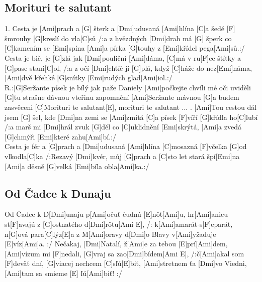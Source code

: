 \documentclass[10pt]{article}
\begin{document}
\begin{Large}
\begin{minipage}{\textwidth}
\subsection{Morituri te salutant}
\begin{multicols}{2}
\begin{guitar}
	1.
	Cesta je [Ami]prach a [G] šterk a [Dmi]udusaná [Ami]hlína 
	[C]a šedé [F] šmrouhy [G]kreslí do vla[C]sů
	/:a z hvězdných [Dmi]drah má [G] šperk 
	co [C]kamením se [Emi]spína 
	[Ami]a pírka [G]touhy z [Emi]křídel pega[Ami]sů.:/	
	\\
	Cesta je bič, je [G]zlá jak [Dmi]pouliční [Ami]dáma, 
	[C]má v ru[F]ce štítky a [G]pase stani[C]ol, 
	/:a z očí [Dmi]chtíč jí [G]plá, když [C]háže do nez[Emi]náma, 
	[Ami]dvě křehké [G]snítky [Emi]rudých glad[Ami]iol.:/
	\\
	R.:[G]Seržante písek je bílý jak paže Daniely
	[Ami]počkejte chvíli mé oči uviděli
	[G]tu strašne dávnou vteřinu zapomnění	
	[Ami]Seržante mávnou [G]a budem zasvěceni	
	[C]Morituri te salutant[E], morituri te salutant ...
	.
	[Ami]Tou cestou dál jsem [G] šel, 
	kde [Dmi]na zemi se [Ami]zmítá	
	[C]a písek [F]víří [G]křídla ho[C]lubí 
	/:a marš mi [Dmi]hrál	zvuk [G]děl 
	co [C]uklidnění [Emi]skrýtá,	
	[Ami]a zvedá [G]chmýři [Emi]které zahu[Ami]bí.:/	
	\\	
	[Ami]Cesta je fér a [G]prach a [Dmi]udusaná [Ami]hlína	
	[C]mosazná [F]včelka [G]od vlkodla[C]ka	
	/:Rezavý [Dmi]kvér, můj [G]prach a [C]sto let stará špí[Emi]na	
	[Ami]a děsně [G]velká [Emi]bíla obla[Ami]ka.:/
\end{guitar}
\end{multicols}
\end{minipage}

\begin{minipage}{\textwidth}
\subsection{Od Čadce k Dunaju}
\begin{multicols}{2}
\begin{guitar}
	[Ami]Od Čadce k D[Dmi]unaju p[Ami]očuť čudnú [E]nôt[Ami]u,
	hr[Ami]anicu st[F]avajú z [G]ostnatého d[Dmi]rôtu[Ami E],
	/: k[Ami]amarát-s[F]eparát, n[G]ová para[C]lýz[E]a
	z M[Ami]oravy d[Dmi]o Blavy v[Ami]yžaduje [E]víz[Ami]a. :/
	\columnbreak
	[Ami]Nečakaj, [Dmi]Natalí, ž[Ami]e za tebou [E]prí[Ami]dem,
	[Ami]vízum mi [F]nedali, [G]vraj sa zao[Dmi]bídem[Ami E],
	/:č[Ami]akal som [F]deväť dní, [G]viacej nechcem [C]sľú[E]biť,
	[Ami]stretnem ťa [Dmi]vo Viedni, [Ami]tam sa smieme [E] ľú[Ami]biť! :/
\end{guitar}
\end{multicols}
\end{minipage}


\end{Large}
\end{document}
